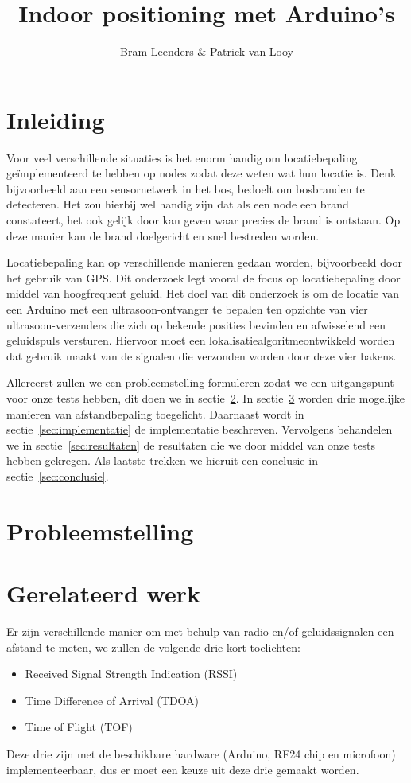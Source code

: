 \documentclass[a4paper,10pt]{article}
\title{Indoor positioning met Arduino's}
\author{Bram Leenders \& Patrick van Looy}
\begin{document}
\maketitle

\section{Inleiding}
Voor veel verschillende situaties is het enorm handig om locatiebepaling ge\"implementeerd te hebben op nodes zodat deze weten wat hun locatie is. Denk bijvoorbeeld aan een sensornetwerk in het bos, bedoelt om bosbranden te detecteren. Het zou hierbij wel handig zijn dat als een node een brand constateert, het ook gelijk door kan geven waar precies de brand is ontstaan. Op deze manier kan de brand doelgericht en snel bestreden worden.

Locatiebepaling kan op verschillende manieren gedaan worden, bijvoorbeeld door het gebruik van GPS. Dit onderzoek legt vooral de focus op locatiebepaling door middel van hoogfrequent geluid. Het doel van dit onderzoek is om de locatie van een Arduino met een ultrasoon-ontvanger te bepalen ten opzichte van vier ultrasoon-verzenders die zich op bekende posities bevinden en afwisselend een geluidspuls versturen. Hiervoor moet een lokalisatiealgoritmeontwikkeld worden dat gebruik maakt van de signalen die verzonden worden door deze vier bakens.

Allereerst zullen we een probleemstelling formuleren zodat we een uitgangspunt voor onze tests hebben, dit doen we in sectie~\ref{sec:probleemstelling}. In sectie~\ref{sec:gerelateerd} worden drie mogelijke manieren van afstandbepaling toegelicht. Daarnaast wordt in sectie~\ref{sec:implementatie} de implementatie beschreven. Vervolgens behandelen we in sectie~\ref{sec:resultaten} de resultaten die we door middel van onze tests hebben gekregen. Als laatste trekken we hieruit een conclusie in sectie~\ref{sec:conclusie}.

\section{Probleemstelling}\label{sec:probleemstelling}

\section{Gerelateerd werk}\label{sec:gerelateerd}
Er zijn verschillende manier om met behulp van radio en/of geluidssignalen een afstand te meten, we zullen de volgende drie kort toelichten:
\begin{itemize}
    \item Received Signal Strength Indication (RSSI)
    \item Time Difference of Arrival (TDOA)
    \item Time of Flight (TOF)
\end{itemize}
Deze drie zijn met de beschikbare hardware (Arduino, RF24 chip en microfoon) implementeerbaar, dus er moet een keuze uit deze drie gemaakt worden.
\end{document}
